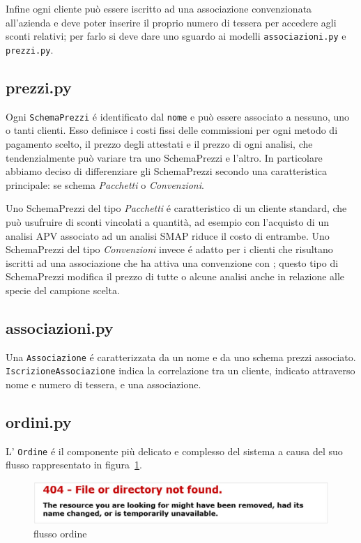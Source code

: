 Infine ogni cliente può essere iscritto ad una associazione convenzionata all'azienda {\fem} e deve poter inserire il proprio numero di tessera per accedere agli sconti relativi; per farlo si deve dare uno sguardo ai modelli \texttt{associazioni.py} e \texttt{prezzi.py}.

\subsection*{prezzi.py}
\label{subs:prezzi}
Ogni \texttt{SchemaPrezzi} é identificato dal \texttt{nome} e può essere associato a nessuno, uno o tanti clienti. Esso definisce i costi fissi delle commissioni per ogni metodo di pagamento scelto, il prezzo degli attestati e il prezzo di ogni analisi, che tendenzialmente può variare tra uno SchemaPrezzi e l'altro.
In particolare abbiamo deciso di differenziare gli SchemaPrezzi secondo una caratteristica principale: se schema \emph{Pacchetti} o \emph{Convenzioni}.

Uno SchemaPrezzi del tipo \emph{Pacchetti} é caratteristico di un cliente standard, che può usufruire di sconti vincolati a quantità, ad esempio con l'acquisto di un analisi APV associato ad un analisi SMAP riduce il costo di entrambe. Uno SchemaPrezzi del tipo \emph{Convenzioni} invece é adatto per i clienti che risultano iscritti ad una associazione che ha attiva una convenzione con {\fem}; questo tipo di SchemaPrezzi modifica il prezzo di tutte o alcune analisi anche in relazione alle specie del campione scelta.

\subsection*{associazioni.py}
\label{subs:associazioni}
Una \texttt{Associazione} é caratterizzata da un nome e da uno schema prezzi associato. \texttt{IscrizioneAssociazione} indica la correlazione tra un cliente, indicato attraverso nome e numero di tessera, e una associazione.

\subsection*{ordini.py}
\label{subs:ordini}
L' \texttt{Ordine} é il componente più delicato e complesso del sistema a causa del suo flusso rappresentato in figura~\ref{fig:flusso-ordine}.

\begin{figure}
 \includegraphics[width=1\textwidth]{images/filenotfound} 
 \caption{flusso ordine}
 \label{fig:flusso-ordine}
\end{figure}

